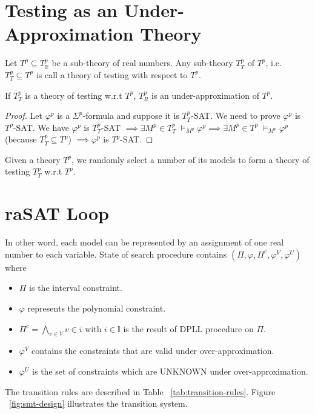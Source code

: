 \section{Testing as an Under-Approximation Theory}
\begin{definition}
Let $T^p \subseteq T^p_\mathbb{R}$ be a sub-theory of real numbers. Any sub-theory $T^p_T$ of $T^p$, i.e. $T^p_T \subseteq T^p$ is call a theory of testing with respect to $T^p$.
\end{definition}

\begin{theorem}
If $T^p_T$ is a theory of testing w.r.t $T^p$, $T^p_R$ is an under-approximation of $T^p$.
\end{theorem}

\begin{proof}
Let $\varphi^p$ is a $\Sigma^p$-formula and suppose it is $T^p_T$-SAT. We need to prove $\varphi^p$ is $T^p$-SAT. We have $\varphi^p$ is $T^p_T$-SAT $\implies \exists M^p \in T^p_T \; \models_{M^p} \varphi^p \implies \exists M^p \in T^p \; \models_{M^p} \varphi^p$ {(because $T^p_T \subseteq T^p$)} $\implies \varphi^p$ is $T^p$-SAT.
\end{proof}

Given a theory $T^p$, we randomly select a number of its models to form a theory of testing $T^p_T$ w.r.t $T^p$.

\section{raSAT Loop}
In other word, each model can be represented by an assignment of one real number to each variable. 
State of search procedure contains  $(\Pi, \varphi, \Pi^c, \varphi^V, \varphi^U)$ where 
\begin{itemize}
\item $\Pi$ is the interval constraint.
\item $\varphi$ represents the polynomial constraint.
\item $\Pi^c = \bigwedge\limits_{v \in V} v \in i$ with $i \in \mathbb{I}$ is the result of DPLL procedure on $\Pi$.
\item $\varphi^V$ contains the constraints that are valid under over-approximation.
\item $\varphi^U$ is the set of constraints which are UNKNOWN under over-approximation.
\end{itemize}
The transition rules are described in Table ~\ref{tab:transition-rules}. Figure ~\ref{fig:smt-design} illustrates the transition system. 

